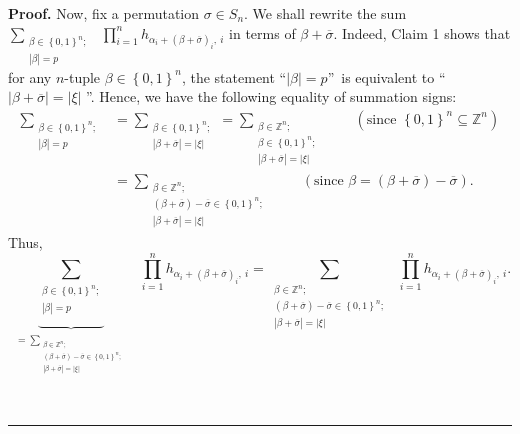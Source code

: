 \documentclass
[numbers=enddot,12pt,final,onecolumn,notitlepage,english]{scrartcl}%
\theoremstyle{definition}
\newenvironment{proof}[1][Proof]{\noindent\textbf{#1.} }{\ \rule{0.5em}{0.5em}}
\let\sumnonlimits\sum
\let\prodnonlimits\prod
\renewcommand{\sum}{\sumnonlimits\limits}
\renewcommand{\prod}{\prodnonlimits\limits}
\newenvironment{verlong}{}{}
\begin{document}
\begin{verlong}
\begin{proof}
Now, fix a permutation $\sigma\in S_{n}$. We shall rewrite the sum
$\sum_{\substack{\beta\in\left\{  0,1\right\}  ^{n};\\\left\vert
\beta\right\vert =p}}\ \ \prod_{i=1}^{n}h_{\alpha_{i}+\left(  \beta
+\overline{\sigma}\right)  _{i},\ i}$ in terms of $\beta+\overline{\sigma}$.
Indeed, Claim 1 shows that for any $n$-tuple $\beta\in\left\{  0,1\right\}
^{n}$, the statement \textquotedblleft$\left\vert \beta\right\vert
=p$\textquotedblright\ is equivalent to \textquotedblleft$\left\vert
\beta+\overline{\sigma}\right\vert =\left\vert \xi\right\vert $%
\textquotedblright. Hence, we have the following equality of summation signs:%
\begin{align*}
\sum_{\substack{\beta\in\left\{  0,1\right\}  ^{n};\\\left\vert \beta
\right\vert =p}}  &  =\sum_{\substack{\beta\in\left\{  0,1\right\}
^{n};\\\left\vert \beta+\overline{\sigma}\right\vert =\left\vert
\xi\right\vert }}=\sum_{\substack{\beta\in\mathbb{Z}^{n};\\\beta\in\left\{
0,1\right\}  ^{n};\\\left\vert \beta+\overline{\sigma}\right\vert =\left\vert
\xi\right\vert }}\ \ \ \ \ \ \ \ \ \ \left(  \text{since }\left\{
0,1\right\}  ^{n}\subseteq\mathbb{Z}^{n}\right) \\
&  =\sum_{\substack{\beta\in\mathbb{Z}^{n};\\\left(  \beta+\overline{\sigma
}\right)  -\overline{\sigma}\in\left\{  0,1\right\}  ^{n};\\\left\vert
\beta+\overline{\sigma}\right\vert =\left\vert \xi\right\vert }%
}\ \ \ \ \ \ \ \ \ \ \left(  \text{since }\beta=\left(  \beta+\overline
{\sigma}\right)  -\overline{\sigma}\right)  .
\end{align*}
Thus,%
\[
\underbrace{\sum_{\substack{\beta\in\left\{  0,1\right\}  ^{n};\\\left\vert
\beta\right\vert =p}}}_{\substack{=\sum_{\substack{\beta\in\mathbb{Z}%
^{n};\\\left(  \beta+\overline{\sigma}\right)  -\overline{\sigma}\in\left\{
0,1\right\}  ^{n};\\\left\vert \beta+\overline{\sigma}\right\vert =\left\vert
\xi\right\vert }}}}\ \ \prod_{i=1}^{n}h_{\alpha_{i}+\left(  \beta
+\overline{\sigma}\right)  _{i},\ i}=\sum_{\substack{\beta\in\mathbb{Z}%
^{n};\\\left(  \beta+\overline{\sigma}\right)  -\overline{\sigma}\in\left\{
0,1\right\}  ^{n};\\\left\vert \beta+\overline{\sigma}\right\vert =\left\vert
\xi\right\vert }}\ \ \prod_{i=1}^{n}h_{\alpha_{i}+\left(  \beta+\overline
{\sigma}\right)  _{i},\ i}.
\]



\end{proof}
\end{verlong}
\end{document}
